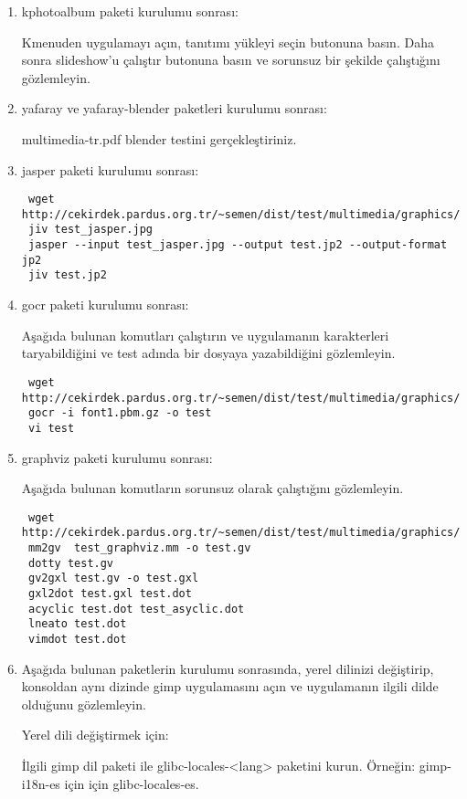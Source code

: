 \documentclass[a4paper,10pt]{article}
\begin{document}
\begin{enumerate}
\item kphotoalbum paketi kurulumu sonrası:

Kmenuden uygulamayı açın, tanıtımı yükleyi seçin butonuna basın. Daha sonra slideshow'u çalıştır butonuna basın ve sorunsuz bir şekilde çalıştığını gözlemleyin.

\item yafaray ve yafaray-blender paketleri kurulumu sonrası:

multimedia-tr.pdf blender testini gerçekleştiriniz.
\item jasper paketi kurulumu sonrası:

\begin{verbatim}
 wget http://cekirdek.pardus.org.tr/~semen/dist/test/multimedia/graphics/test_jasper.jpg
 jiv test_jasper.jpg
 jasper --input test_jasper.jpg --output test.jp2 --output-format jp2
 jiv test.jp2
\end{verbatim}


 \item gocr paketi kurulumu sonrası:

Aşağıda bulunan komutları çalıştırın ve uygulamanın karakterleri taryabildiğini ve test adında bir dosyaya yazabildiğini gözlemleyin.
\begin{verbatim}
 wget http://cekirdek.pardus.org.tr/~semen/dist/test/multimedia/graphics/font1.pbm.gz
 gocr -i font1.pbm.gz -o test
 vi test
\end{verbatim}

\item graphviz paketi kurulumu sonrası:

Aşağıda bulunan komutların sorunsuz olarak çalıştığını gözlemleyin.
\begin{verbatim}
 wget http://cekirdek.pardus.org.tr/~semen/dist/test/multimedia/graphics/test_graphviz.mm
 mm2gv  test_graphviz.mm -o test.gv
 dotty test.gv
 gv2gxl test.gv -o test.gxl
 gxl2dot test.gxl test.dot
 acyclic test.dot test_asyclic.dot
 lneato test.dot
 vimdot test.dot
\end{verbatim}

 \item Aşağıda bulunan paketlerin kurulumu sonrasında, yerel dilinizi değiştirip, konsoldan aynı dizinde gimp uygulamasını açın ve uygulamanın ilgili dilde olduğunu gözlemleyin.

Yerel dili değiştirmek için:

İlgili gimp dil paketi ile glibc-locales-<lang> paketini kurun. Örneğin: gimp-i18n-es için için glibc-locales-es.


\end{enumerate}
\end{document}
